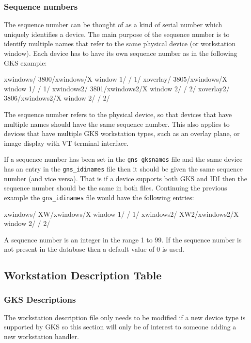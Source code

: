 \documentclass[twoside,11pt,nolof]{starlink}
\begin{document}
\subsubsection{\label{seqno}Sequence numbers}

The sequence number can be thought of as a kind of serial number which
uniquely identifies a device. The main purpose of the sequence number
is to identify multiple names that refer to the same
physical device (or workstation window).
Each device has to have its own sequence
number as in the following GKS example:
\begin{terminalv}
xwindows/   3800/xwindows/X window 1/ / 1/
xoverlay/ 3805/xwindows/X window 1/ / 1/
xwindows2/   3801/xwindows2/X window 2/ / 2/
xoverlay2/ 3806/xwindows2/X window 2/ / 2/
\end{terminalv}
The sequence number refers to the physical device, so that devices that
have multiple names should have the same sequence number. This also
applies to devices that have multiple GKS workstation types, such as an
overlay plane, or image display with VT terminal interface.

If a sequence number has been set in the \texttt{gns\_gksnames} file and the same
device has an entry in the \texttt{gns\_idinames} file then it should be given
the same sequence number (and vice versa). That is if a device supports
both GKS and IDI then the sequence number should be the same in both files.
Continuing the previous example the \texttt{gns\_idinames} file would have
the following entries:
\begin{terminalv}
xwindows/   XW/xwindows/X window 1/ / 1/
xwindows2/  XW2/xwindows2/X window 2/ / 2/
\end{terminalv}

A sequence number is an integer in the range 1 to 99. If the sequence number
is not present in the database then a default value of 0 is used.

\subsection{Workstation Description Table}\label{wdt}

\subsubsection{GKS Descriptions}

The workstation description file only needs to be modified if a new device type
is supported by GKS so this section will only be of interest to someone adding
a new workstation handler.
\end{document}
